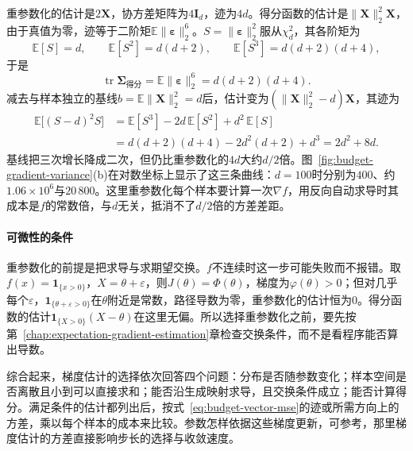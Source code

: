重参数化的估计是$2\bm{X}$，协方差矩阵为$4\bm{I}_d$，迹为$4d$。得分函数的估计是$\lVert\bm{X}\rVert_2^{2}\bm{X}$，由于真值为零，迹等于二阶矩$\mathbb{E}\lVert\bm{\varepsilon}\rVert_2^{6}$。$S=\lVert\bm{\varepsilon}\rVert_2^{2}$服从$\chi^{2}_{d}$，其各阶矩为
\[
  \mathbb{E}[S]=d,\qquad\mathbb{E}[S^{2}]=d(d+2),\qquad\mathbb{E}[S^{3}]=d(d+2)(d+4),
\]
于是
\[
  \operatorname{tr}\bm{\Sigma}_{\text{得分}}=\mathbb{E}\lVert\bm{\varepsilon}\rVert_2^{6}=d(d+2)(d+4).
\]
减去与样本独立的基线$b=\mathbb{E}\lVert\bm{X}\rVert_2^{2}=d$后，估计变为$(\lVert\bm{X}\rVert_2^{2}-d)\bm{X}$，其迹为
\[
  \begin{aligned}
    \mathbb{E}\bigl[(S-d)^{2}S\bigr]&=\mathbb{E}[S^{3}]-2d\,\mathbb{E}[S^{2}]+d^{2}\,\mathbb{E}[S]\\
    &=d(d+2)(d+4)-2d^{2}(d+2)+d^{3}=2d^{2}+8d .
  \end{aligned}
\]
基线把三次增长降成二次，但仍比重参数化的$4d$大约$d/2$倍。图~\ref{fig:budget-gradient-variance}(b)在对数坐标上显示了这三条曲线：$d=100$时分别为$400$、约$1.06\times10^{6}$与$20\,800$。这里重参数化每个样本要计算一次$\nabla f$，用反向自动求导时其成本是$f$的常数倍，与$d$无关，抵消不了$d/2$倍的方差差距。

\paragraph{可微性的条件}
重参数化的前提是把求导与求期望交换。$f$不连续时这一步可能失败而不报错。取$f(x)=\mathbf{1}_{\{x>0\}}$，$X=\theta+\varepsilon$，则$J(\theta)=\Phi(\theta)$，梯度为$\varphi(\theta)>0$；但对几乎每个$\varepsilon$，$\mathbf{1}_{\{\theta+\varepsilon>0\}}$在$\theta$附近是常数，路径导数为零，重参数化的估计恒为$0$。得分函数的估计$\mathbf{1}_{\{X>0\}}(X-\theta)$在这里无偏。所以选择重参数化之前，要先按第~\ref{chap:expectation-gradient-estimation}章检查交换条件，而不是看程序能否算出导数。

综合起来，梯度估计的选择依次回答四个问题：分布是否随参数变化；样本空间是否离散且小到可以直接求和；能否沿生成映射求导，且交换条件成立；能否计算得分。满足条件的估计都列出后，按式~\eqref{eq:budget-vector-mse}的迹或所需方向上的方差，乘以每个样本的成本来比较。参数怎样依据这些梯度更新，可参考，那里梯度估计的方差直接影响步长的选择与收敛速度。
